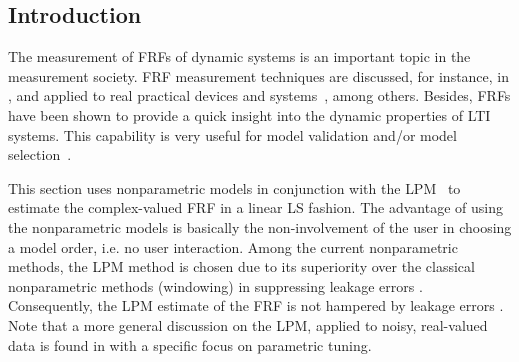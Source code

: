 


\subsection{Introduction}

The measurement of \glspl{FRF} of dynamic systems is an important topic in the measurement society.
\gls{FRF} measurement techniques are discussed, for instance, in
\citep{Schoukens1998,Schoukens2006LPM,Guillaume1996,Broersen1995,Pintelon2010LPM1,Antoni2007FRF,Pintelon2012}, and applied to real practical devices and systems~\citep{Lim2010,Robinson1990,Behjat2010}, among others.
Besides, \glspl{FRF} have been shown to provide a quick insight into the dynamic properties of \gls{LTI} systems.
This capability is very useful for model validation and/or model selection~\citep{Pintelon2012}.

This section uses nonparametric models in conjunction with the \gls{LPM}~\citep{Pintelon2010LPM1} to estimate the complex-valued \gls{FRF} in a linear \gls{LS} fashion.
The advantage of using the nonparametric models is basically the non-involvement of the user in choosing a model order, i.e. no user interaction. Among the current nonparametric methods, the \gls{LPM} method is chosen due to its superiority over the classical nonparametric methods (windowing) in suppressing leakage errors \citep{Bendat1993,Oppenheim1983}. 
Consequently, the \gls{LPM} estimate of the \gls{FRF} is not hampered by leakage errors \citep{Pintelon2010LPM1,Schoukens2009LPM}. Note that a more general discussion on the \gls{LPM}, applied to noisy, real-valued data is found in \citep{Fan1996} with a specific focus on parametric tuning.

